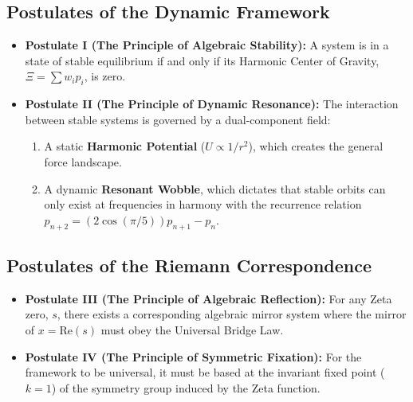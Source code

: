 \subsection{Postulates of the Dynamic Framework}
\begin{itemize}
    \item \textbf{Postulate I (The Principle of Algebraic Stability):} A system is in a state of stable equilibrium if and only if its Harmonic Center of Gravity, $\Xi = \sum w_i p_i$, is zero.
    
    \item \textbf{Postulate II (The Principle of Dynamic Resonance):} The interaction between stable systems is governed by a dual-component field:
    \begin{enumerate}
        \item A static \textbf{Harmonic Potential} ($U \propto 1/r^2$), which creates the general force landscape.
        \item A dynamic \textbf{Resonant Wobble}, which dictates that stable orbits can only exist at frequencies in harmony with the recurrence relation $p_{n+2} = (2\cos(\pi/5))p_{n+1} - p_n$.
    \end{enumerate}
\end{itemize}

\subsection{Postulates of the Riemann Correspondence}
\begin{itemize}
    \item \textbf{Postulate III (The Principle of Algebraic Reflection):} For any Zeta zero, $s$, there exists a corresponding algebraic mirror system where the mirror of $x=\text{Re}(s)$ must obey the Universal Bridge Law.
    
    \item \textbf{Postulate IV (The Principle of Symmetric Fixation):} For the framework to be universal, it must be based at the invariant fixed point ($k=1$) of the symmetry group induced by the Zeta function.
\end{itemize}






\usepackage{palatino}
\usepackage{amsmath}
\usepackage{amssymb}
\usepackage[a4paper, total={6in, 8in}]{geometry}
\usepackage{etoolbox}
\usepackage[unicode=true, pdfencoding=auto, psdextra, hypertexnames=false]{hyperref} %
\usepackage{microtype} %
\usepackage{xcolor}  %
\usepackage{textcomp}  %
\usepackage[utf8]{inputenc}  %
\usepackage{graphicx}
\usepackage{float}
\usepackage{chngcntr}  %

